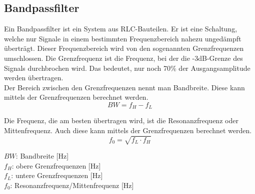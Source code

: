 \documentclass[12pt]{scrartcl}
\begin{document}
\subsection{Bandpassfilter}
Ein Bandpassfilter ist ein System aus RLC-Bauteilen. 
Er ist eine Schaltung, welche nur Signale in einem bestimmten Frequenzbereich nahezu ungedämpft überträgt.
Dieser Frequenzbereich wird von den sogenannten Grenzfrequenzen umschlossen.
Die Grenzfrequenz ist die Frequenz, bei der die -3dB-Grenze des Signals durchbrochen wird.
Das bedeutet, nur noch 70\% der Ausgangsamplitude werden übertragen.\\
Der Bereich zwischen den Grenzfrequenzen nennt man Bandbreite.
Diese kann mittels der Grenzfrequenzen berechnet werden.
\begin{equation}
    BW = f_H-f_L 
    \label{Gl:Bandweite}
\end{equation}

Die Frequenz, die am besten übertragen wird, ist die Resonanzfrequenz oder Mittenfrequenz. 
Auch diese kann mittels der Grenzfrequenzen berechnet werden.
\begin{equation}
    f_0=\sqrt{f_L\cdot f_H}
    \label{Gl:Mittenfrequenz}
\end{equation}
\begin{center}
    $BW$: Bandbreite [Hz]\\
    $f_H$: obere Grenzfrequenzen [Hz]\\
    $f_L$: untere Grenzfrequenzen [Hz]\\
    $f_0$: Resonanzfrequenz/Mittenfrequenz [Hz]
\end{center}



\newpage
\end{document}
